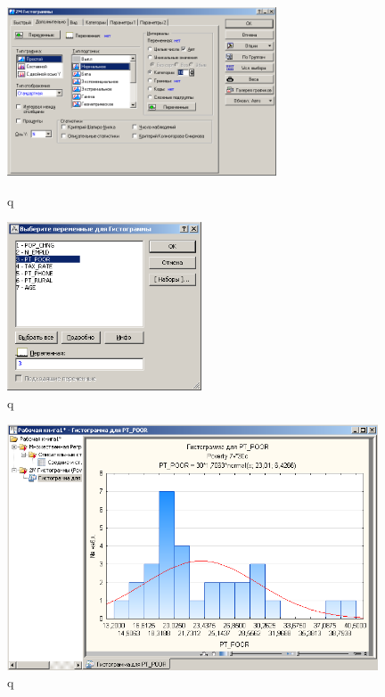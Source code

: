 \begin{figure}[!h]
  \centering
  \begin{minipage}{0.49\textwidth}
    \centering

    \includegraphics[height=5cm]
    {inc/example_7.PNG}

    \caption{q}
    \label{fig:example_7}
  \end{minipage}
  \begin{minipage}{0.49\textwidth}
    \centering

    \includegraphics[height=5cm]
    {inc/example_8.PNG}

    \caption{q}
    \label{fig:example_8}
  \end{minipage}
\end{figure}

\begin{figure}[!h]
  \centering

  \includegraphics[width=11cm]
  {inc/example_9.PNG}

  \caption{q}

  \label{fig:example_9}
\end{figure}

